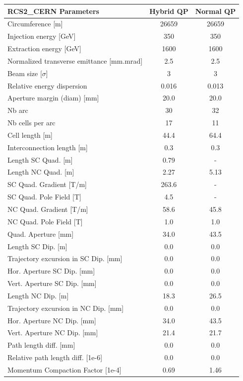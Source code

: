 \begin{tabular}{lcc}
\toprule
RCS2_CERN Parameters & Hybrid QP & Normal QP \\
\midrule
Circumference [m] & 26659 & 26659 \\
Injection energy [GeV] & 350 & 350 \\
Extraction energy [GeV] & 1600 & 1600 \\
Normalized transverse emittance [mm.mrad] & 2.5 & 2.5 \\
Beam size [$\sigma$] & 3 & 3 \\
Relative energy dispersion & 0.016 & 0.013 \\
Aperture margin (diam) [mm] & 20.0 & 20.0 \\
Nb arc & 30 & 32 \\
Nb cells per arc & 17 & 11 \\
Cell length [m] & 44.4 & 64.4 \\
Interconnection length [m] & 0.3 & 0.3 \\
Length SC Quad. [m] & 0.79 & - \\
Length NC Quad. [m] & 2.27 & 5.13 \\
SC Quad. Gradient [T/m] & 263.6 & - \\
SC Quad. Pole Field [T] & 4.5 & - \\
NC Quad. Gradient [T/m] & 58.6 & 45.8 \\
NC Quad. Pole Field [T] & 1.0 & 1.0 \\
Quad. Aperture [mm] & 34.0 & 43.5 \\
Length SC Dip. [m] & 0.0 & 0.0 \\
Trajectory excursion in SC Dip. [mm] & 0.0 & 0.0 \\
Hor. Aperture SC Dip. [mm] & 0.0 & 0.0 \\
Vert. Aperture SC Dip. [mm] & 0.0 & 0.0 \\
Length NC Dip. [m] & 18.3 & 26.5 \\
Trajectory excursion in NC Dip. [mm] & 0.0 & 0.0 \\
Hor. Aperture NC Dip. [mm] & 34.0 & 43.5 \\
Vert. Aperture NC Dip. [mm] & 21.4 & 21.7 \\
Path length diff. [mm] & 0.0 & 0.0 \\
Relative path length diff. [1e-6] & 0.0 & 0.0 \\
Momentum Compaction Factor [1e-4] & 0.69 & 1.46 \\
\bottomrule
\end{tabular}
